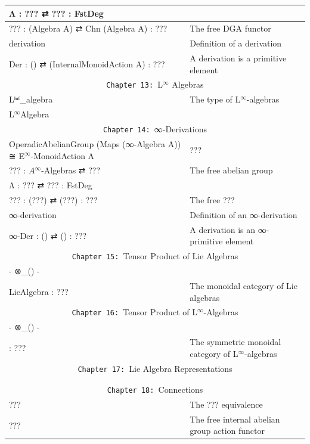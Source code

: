 \documentclass{book}
\theoremstyle{definition}
\begin{document}
{\begin{longtable}{|| l || l ||}
\hline
Λ : ??? ⇄ ??? : FstDeg & \\ 
\hline
??? : (Algebra A) ⇄ Chn (Algebra A) : ??? & The free DGA functor \\
\hline 
derivation & Definition of a derivation \\
\hline
Der : () ⇄ (InternalMonoidAction A) : ??? & A derivation is a primitive element \\
\hline \hline
\multicolumn{2}{||c||}{\texttt{Chapter 13: }L${}^{\infty}$ Algebras} \\
\hline \hline
Lⁱⁿᶠ\_algebra & The type of L${}^{\infty}$-algebras  \\
\hline
L${}^{\infty}$Algebra &  \\
\hline \hline
\multicolumn{2}{||c||}{\texttt{Chapter 14: }∞-Derivations} \\
\hline \hline
OperadicAbelianGroup (Maps (∞-Algebra A)) ≅ E${}^{\infty}$-MonoidAction A & ??? \\
\hline
??? : $A{}^{\infty}$-Algebras ⇄ ???  & The free abelian group \\
\hline
Λ : ??? ⇄ ??? : FstDeg &  \\ 
\hline
??? : (???) ⇄ (???) : ??? & The free ??? \\
\hline
∞-derivation & Definition of an ∞-derivation \\
\hline
∞-Der : () ⇄ () : ??? & A derivation is an ∞-primitive element \\
\hline \hline
\multicolumn{2}{||c||}{\texttt{Chapter 15: }Tensor Product of Lie Algebras} \\
\hline \hline
- ⊗\_() - &  \\
\hline
LieAlgebra : ??? & The monoidal category of Lie algebras\\
\hline \hline
\multicolumn{2}{||c||}{\texttt{Chapter 16: }Tensor Product of L${}^{\infty}$-Algebras} \\
\hline \hline
- ⊗\_() - & \\ 
 \hline
 : ??? & The symmetric monoidal category of L${}^{\infty}$-algebras \\
 \hline \hline
\multicolumn{2}{||c||}{\texttt{Chapter 17: }Lie Algebra Representations} \\
\hline \hline
 & \\
\hline
 & \\
\hline \hline
\multicolumn{2}{||c||}{\texttt{Chapter 18: }Connections} \\
\hline \hline
??? & The ??? equivalence \\
\hline
??? & The free internal abelian group action functor \\

\end{longtable}}
\end{document}
